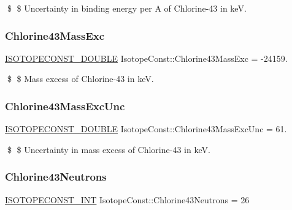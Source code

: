 \$ \$ Uncertainty in binding energy per A of Chlorine-\/43 in keV. \mbox{\label{group___isotope_const-_chlorine-_cl43_gad923d4e49569bc24cfe1c2ff7f8d957f}} 
\subsubsection{\texorpdfstring{Chlorine43\+Mass\+Exc}{Chlorine43MassExc}}
{\footnotesize\ttfamily \mbox{\hyperlink{group___isotope_const-_macros_ga8f45a7272ce02c0b4c65c44636ed719a}{I\+S\+O\+T\+O\+P\+E\+C\+O\+N\+S\+T\+\_\+\+D\+O\+U\+B\+LE}} Isotope\+Const\+::\+Chlorine43\+Mass\+Exc = -\/24159.}

\$ \$ Mass excess of Chlorine-\/43 in keV. \mbox{\label{group___isotope_const-_chlorine-_cl43_ga792e7ca865d8d68407bad01c6eebbae6}} 
\subsubsection{\texorpdfstring{Chlorine43\+Mass\+Exc\+Unc}{Chlorine43MassExcUnc}}
{\footnotesize\ttfamily \mbox{\hyperlink{group___isotope_const-_macros_ga8f45a7272ce02c0b4c65c44636ed719a}{I\+S\+O\+T\+O\+P\+E\+C\+O\+N\+S\+T\+\_\+\+D\+O\+U\+B\+LE}} Isotope\+Const\+::\+Chlorine43\+Mass\+Exc\+Unc = 61.}

\$ \$ Uncertainty in mass excess of Chlorine-\/43 in keV. \mbox{\label{group___isotope_const-_chlorine-_cl43_ga97cf617208d91ad6d1b2f2dc2ff87dcb}} 
\subsubsection{\texorpdfstring{Chlorine43\+Neutrons}{Chlorine43Neutrons}}
{\footnotesize\ttfamily \mbox{\hyperlink{group___isotope_const-_macros_ga5f18360b3e99483a35c32d789e62621c}{I\+S\+O\+T\+O\+P\+E\+C\+O\+N\+S\+T\+\_\+\+I\+NT}} Isotope\+Const\+::\+Chlorine43\+Neutrons = 26}

